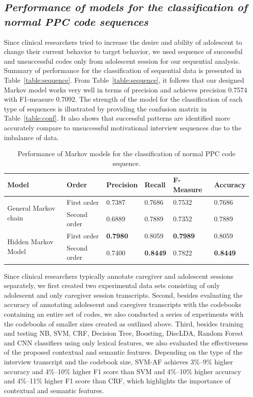\documentclass{amia}
\begin{document}
\subsection*{\textit{Performance of models for the classification of normal PPC code sequences}}
Since clinical researchers tried to increase the desire and ability of adolescent to change their current behavior to target behavior, we used sequence of successful and unsuccessful codes only from adolescent session for our sequential analysis. Summary of performance for the classification of sequential data is presented in Table~\ref{table:sequence}. From Table~\ref{table:sequence}, it follows that our designed Markov model works very well in terms of precision and achieves precision 0.7574 with F1-measure 0.7092. The strength of the model for the classification of each type of sequences is illustrated by providing the confusion matrix in Table~\ref{table:conf}. It also shows that successful patterns are identified more accurately compare to unsuccessful motivational interview sequences due to the imbalance of data.\\

\begin{table}[h]
\centering
\caption{Performance of Markov models for the classification of normal PPC code sequence.}
\label{tab:result_norm_seq}
  \begin{tabular}{|l|l|l|l|l|l|}
  \hline
   \textbf{Model} & \textbf{Order}  & \textbf{Precision}  & \textbf{Recall} & \textbf{F-Measure} & \textbf{Accuracy}\\ \hline    
    
 \multirow{2}{*}{General Markov chain} & First order & 0.7387 & 0.7686 & 0.7532 & 0.7686\\\cline{2-6}
 & Second order & 0.6889 & 0.7889 & 0.7352 & 0.7889\\ \hline
 \multirow{2}{*}{Hidden Markov Model} & First order & \textbf{0.7980} & 0.8059 & \textbf{0.7989} & 0.8059\\ \cline{2-6}
 & Second order & 0.7400 & \textbf{0.8449} & 0.7822  & \textbf{0.8449}\\ \hline
 
  \end{tabular}
\end{table} 

Since clinical researchers typically annotate caregiver and adolescent sessions separately, we first created two experimental data sets consisting of only adolescent and only caregiver session transcripts. Second, besides evaluating the accuracy of annotating adolescent and caregiver transcripts with the codebooks containing an entire set of codes, we also conducted a series of experiments with the codebooks of smaller sizes created as outlined above. Third, besides training and testing NB, SVM, CRF, Decision Tree, Boosting, DiscLDA, Random Forest and CNN classifiers using only lexical features, we also evaluated the effectiveness of the proposed contextual and semantic features. Depending on the type of the interview transcript and the codebook size, SVM-AF achieves 3\%--9\% higher accuracy and 4\%--10\% higher F1 score than SVM and 4\%--10\% higher accuracy and 4\%--11\% higher F1 score than CRF, which highlights the importance of contextual and semantic features.
\end{document}
